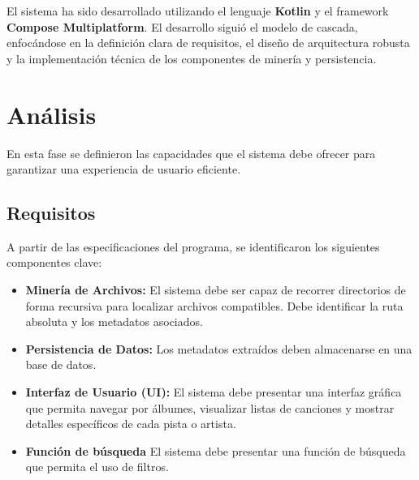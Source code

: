 \documentclass[12pt,a4paper]{article}
\begin{document}
El sistema ha sido desarrollado utilizando el lenguaje \textbf{Kotlin} y el framework \textbf{Compose Multiplatform}. El desarrollo siguió el modelo de cascada, enfocándose en la definición clara de requisitos, el diseño de arquitectura robusta y la implementación técnica de los componentes de minería y persistencia.

\section{Análisis}
En esta fase se definieron las capacidades que el sistema debe ofrecer para garantizar una experiencia de usuario eficiente.

\subsection{Requisitos}
A partir de las especificaciones del programa, se identificaron los siguientes componentes clave:

\begin{itemize}
  \item \textbf{Minería de Archivos:} El sistema debe ser capaz de recorrer directorios de forma recursiva para localizar archivos compatibles. Debe identificar la ruta absoluta y los metadatos asociados.
  \item \textbf{Persistencia de Datos:} Los metadatos extraídos deben almacenarse en una base de datos.
  \item \textbf{Interfaz de Usuario (UI):} El sistema debe presentar una interfaz gráfica que permita navegar por álbumes, visualizar listas de canciones y mostrar detalles específicos de cada pista o artista.
  \item \textbf{Función de búsqueda} El sistema debe presentar una función de búsqueda que permita el uso de filtros.
\end{itemize}
\end{document}
